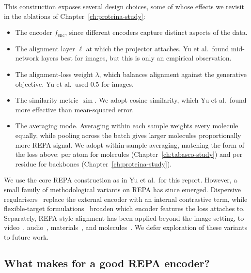 \documentclass[12pt,a4paper,twoside]{report}
\begin{document}
This construction exposes several design choices, some of whose effects we revisit in the ablations of Chapter~\ref{ch:proteina-study}:
\begin{itemize}
  \item The encoder $f_{\text{enc}}$, since different encoders capture distinct aspects of the data.
  \item The alignment layer $\ell$ at which the projector attaches. Yu et al.\ found mid-network layers best for images, but this is only an empirical observation.
  \item The alignment-loss weight $\lambda$, which balances alignment against the generative objective. Yu et al.\ used $0.5$ for images.
  \item The similarity metric $\operatorname{sim}$. We adopt cosine similarity, which Yu et al.\ found more effective than mean-squared error.
  \item The averaging mode. Averaging within each sample weights every molecule equally, while pooling across the batch gives larger molecules proportionally more REPA signal. We adopt within-sample averaging, matching the form of the loss above: per atom for molecules (Chapter~\ref{ch:tabasco-study}) and per residue for backbones (Chapter~\ref{ch:proteina-study}).
\end{itemize}

We use the core REPA construction as in Yu et al.\ for this report. However, a small family of methodological variants on REPA has since emerged. Dispersive regularisers~\cite{DiffuseDisperse} replace the external encoder with an internal contrastive term, while flexible-target formulations~\cite{REED} broaden which encoder features the loss attaches to. Separately, REPA-style alignment has been applied beyond the image setting, to video~\cite{VideoREPA}, audio~\cite{TARO}, materials~\cite{CrystalREPA}, and molecules~\cite{BoltzREPA}. We defer exploration of these variants to future work.

\subsection{What makes for a good REPA encoder?}
\label{sec:encoder-characterisation}

\end{document}
